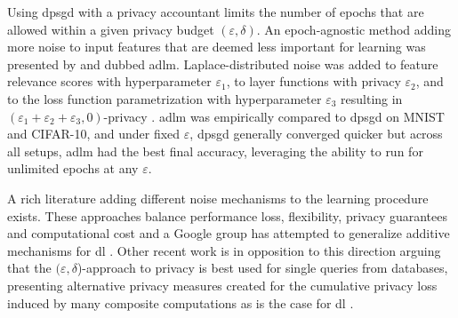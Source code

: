 \documentclass[12pt,fleqn,twocolumn]{article}
\begin{document}
Using \acrshort{dpsgd} with a privacy accountant limits the number of epochs that are allowed within a given privacy budget $(\varepsilon, \delta)$.
An epoch-agnostic method adding more noise to input features that are deemed less important for learning was presented by \textcite{Phan2017AdaptiveLM} and dubbed \acrfull{adlm}.
Laplace-distributed noise was added to feature relevance scores with hyperparameter $\varepsilon_1$, to layer functions with privacy $\varepsilon_2$, and to the loss function parametrization with hyperparameter $\varepsilon_3$ resulting in $(\varepsilon_1+\varepsilon_2+\varepsilon_3, 0)$-privacy \cite[CHap. III. D]{Phan2017AdaptiveLM}.
\acrshort{adlm} was empirically compared to \acrshort{dpsgd} on MNIST and CIFAR-10, and under fixed $\varepsilon$, \acrshort{dpsgd} generally converged quicker but across all setups, \acrshort{adlm} had the best final accuracy, leveraging the ability to run for unlimited epochs at any $\varepsilon$.

A rich literature adding different noise mechanisms to the learning procedure exists.
These approaches balance performance loss, flexibility, privacy guarantees and computational cost and a Google group has attempted to generalize additive mechanisms for \acrshort{dl} \cite{McMahan2018AGA}.
Other recent work is in opposition to this direction arguing that the $(\varepsilon, \delta$)-approach to privacy is best used for single queries from databases, presenting alternative privacy measures created for the cumulative privacy loss induced by many composite computations as is the case for \acrshort{dl} \cite{Yu2019DifferentiallyPM}.
\end{document}
